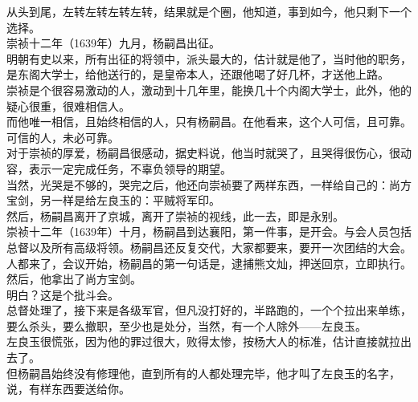 \begin{multicols}{\theparacolNo}
从头到尾，左转左转左转左转，结果就是个圈，他知道，事到如今，他只剩下一个选择。\\

崇祯十二年（1639年）九月，杨嗣昌出征。\\

明朝有史以来，所有出征的将领中，派头最大的，估计就是他了，当时他的职务，是东阁大学士，给他送行的，是皇帝本人，还跟他喝了好几杯，才送他上路。\\

崇祯是个很容易激动的人，激动到十几年里，能换几十个内阁大学士，此外，他的疑心很重，很难相信人。\\

而他唯一相信，且始终相信的人，只有杨嗣昌。在他看来，这个人可信，且可靠。\\

可信的人，未必可靠。\\

对于崇祯的厚爱，杨嗣昌很感动，据史料说，他当时就哭了，且哭得很伤心，很动容，表示一定完成任务，不辜负领导的期望。\\

当然，光哭是不够的，哭完之后，他还向崇祯要了两样东西，一样给自己的：尚方宝剑，另一样是给左良玉的：平贼将军印。\\

然后，杨嗣昌离开了京城，离开了崇祯的视线，此一去，即是永别。\\

崇祯十二年（1639年）十月，杨嗣昌到达襄阳，第一件事，是开会。与会人员包括总督以及所有高级将领。杨嗣昌还反复交代，大家都要来，要开一次团结的大会。\\

人都来了，会议开始，杨嗣昌的第一句话是，逮捕熊文灿，押送回京，立即执行。\\

然后，他拿出了尚方宝剑。\\

明白？这是个批斗会。\\

总督处理了，接下来是各级军官，但凡没打好的，半路跑的，一个个拉出来单练，要么杀头，要么撤职，至少也是处分，当然，有一个人除外——左良玉。\\

左良玉很慌张，因为他的罪过很大，败得太惨，按杨大人的标准，估计直接就拉出去了。\\

但杨嗣昌始终没有修理他，直到所有的人都处理完毕，他才叫了左良玉的名字，说，有样东西要送给你。\\


\end{multicols}
